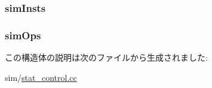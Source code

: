 \label{structStats_1_1Global_ade31e6bd5249c4c177a243712087273d}
\hypertarget{structStats_1_1Global_a4f0a0c52f94351c861630b23cb71be8b}{
\subsubsection[{simInsts}]{ {\bf simInsts}}}
\label{structStats_1_1Global_a4f0a0c52f94351c861630b23cb71be8b}
\hypertarget{structStats_1_1Global_af015afd21d265f4e400aca0c73382472}{
\subsubsection[{simOps}]{ {\bf simOps}}}
\label{structStats_1_1Global_af015afd21d265f4e400aca0c73382472}


この構造体の説明は次のファイルから生成されました:\begin{DoxyCompactItemize}
\item 
sim/\hyperlink{stat__control_8cc}{stat\_\-control.cc}\end{DoxyCompactItemize}
